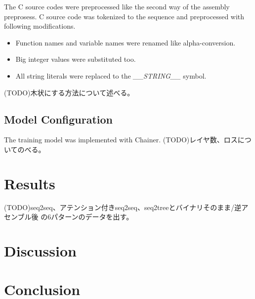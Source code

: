 \documentclass[senior,final,11pt]{iscs-thesis}
\begin{document}
The C source codes were preprocessed like the second way of the assembly preprosess.
C source code was tokenized to the sequence and preprocessed with following modifications.
\begin{itemize}
\item Function names and variable names were renamed like alpha-conversion.
\item Big integer values were substituted too. 
\item All string literals were replaced to the {\sl \_\_STRING\_\_} symbol.
\end{itemize}

(TODO)木状にする方法について述べる。


\section{Model Configuration}
The training model was implemented with Chainer.
(TODO)レイヤ数、ロスについてのべる。

\chapter{Results}
(TODO)seq2seq、アテンション付きseq2seq、seq2treeとバイナリそのまま/逆アセンブル後 の6パターンのデータを出す。
\chapter{Discussion}
\chapter{Conclusion}



\end{document}
